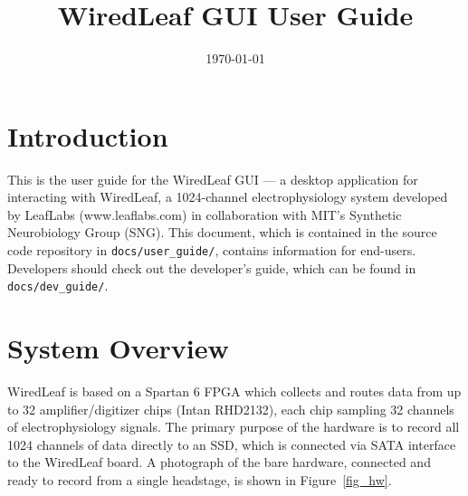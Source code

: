% 


\usepackage{bm}

\title{WiredLeaf GUI User Guide}
\date{\today}


\maketitle


\section{Introduction}
\label{sec_intro}

This is the user guide for the WiredLeaf GUI --- a desktop application for interacting with WiredLeaf, a 1024-channel electrophysiology system developed by LeafLabs (www.leaflabs.com) in collaboration with MIT's Synthetic Neurobiology Group (SNG). This document, which is contained in the source code repository in \texttt{docs/user\_guide/}, contains information for end-users. Developers should check out the developer's guide, which can be found in \texttt{docs/dev\_guide/}.


\section{System Overview}
\label{sec_overview}

WiredLeaf is based on a Spartan 6 FPGA which collects and routes data from up to 32 amplifier/digitizer chips (Intan RHD2132), each chip sampling 32 channels of electrophysiology signals. The primary purpose of the hardware is to record all 1024 channels of data directly to an SSD, which is connected via SATA interface to the WiredLeaf board. A photograph of the bare hardware, connected and ready to record from a single headstage, is shown in Figure~\ref{fig_hw}.

